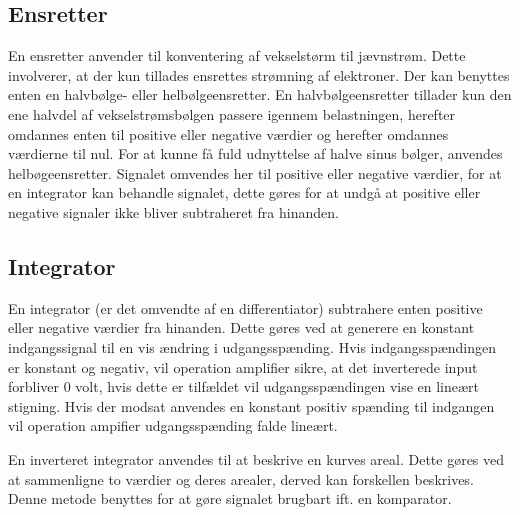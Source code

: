 \subsection{Ensretter}
En ensretter anvender til konventering af vekselstørm til jævnstrøm. Dette involverer, at der kun tillades ensrettes strømning af elektroner. Der kan benyttes enten en halvbølge- eller helbølgeensretter. En halvbølgeensretter tillader kun den ene halvdel af vekselstrømsbølgen passere igennem belastningen, herefter omdannes enten til positive eller negative værdier og herefter omdannes værdierne til nul.
For at kunne få fuld udnyttelse af halve sinus bølger, anvendes helbøgeensretter. Signalet omvendes her til positive eller negative værdier, for at en integrator kan behandle signalet, dette gøres for at undgå at positive eller negative signaler ikke bliver subtraheret fra hinanden. \cite{EEtech2003}

\subsection{Integrator}
En integrator (er det omvendte af en differentiator) subtrahere enten positive eller negative værdier fra hinanden. Dette gøres ved at generere en konstant indgangssignal til en vis ændring i udgangsspænding. Hvis indgangsspændingen er konstant og negativ, vil operation amplifier sikre, at det inverterede input forbliver 0 volt, hvis dette er tilfældet vil udgangsspændingen vise en lineært stigning. Hvis der modsat anvendes en konstant positiv spænding til indgangen vil operation ampifier udgangsspænding falde lineært. \cite{EEtech2003}

En inverteret integrator anvendes til at beskrive en kurves areal. Dette gøres ved at sammenligne to værdier og deres arealer, derved kan forskellen beskrives. Denne metode benyttes for at gøre signalet brugbart ift. en komparator.

